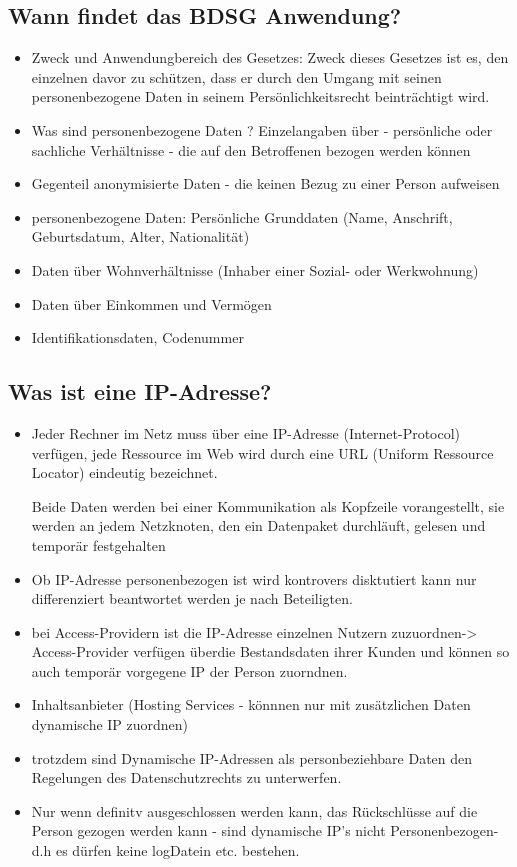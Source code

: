 \documentclass[a4paper,10pt]{scrartcl}
\begin{document}
\subsection{Wann findet das BDSG Anwendung?}
\begin{itemize}
 \item Zweck und Anwendungbereich des Gesetzes: Zweck dieses Gesetzes ist es, den einzelnen
 davor zu schützen, dass er durch den Umgang mit seinen personenbezogene Daten in seinem
 Persönlichkeitsrecht beinträchtigt wird.
 \item Was sind personenbezogene Daten ? Einzelangaben über - persönliche oder sachliche Verhältnisse - die auf den
 Betroffenen bezogen werden können
 \item Gegenteil anonymisierte Daten - die keinen Bezug zu einer Person aufweisen
 \item personenbezogene Daten: Persönliche Grunddaten (Name, Anschrift, Geburtsdatum, Alter, Nationalität)
 \item Daten über Wohnverhältnisse (Inhaber einer Sozial- oder Werkwohnung)
 \item Daten über Einkommen und Vermögen
 \item Identifikationsdaten, Codenummer
\end{itemize}

\subsection{Was ist eine IP-Adresse?}
\begin{itemize}
\item Jeder Rechner im Netz muss über eine IP-Adresse (Internet-Protocol) 
verfügen, jede Ressource im Web wird durch eine URL (Uniform Ressource 
Locator) eindeutig bezeichnet.

Beide Daten werden bei einer Kommunikation als Kopfzeile vorangestellt, sie 
werden an jedem Netzknoten, den ein Datenpaket durchläuft, gelesen und 
temporär festgehalten

\item Ob IP-Adresse personenbezogen ist wird kontrovers disktutiert kann nur differenziert beantwortet werden
je nach Beteiligten.
\item bei Access-Providern ist die IP-Adresse einzelnen Nutzern zuzuordnen->
Access-Provider verfügen überdie Bestandsdaten ihrer Kunden und können so auch
temporär vorgegene IP der Person zuorndnen.
\item Inhaltsanbieter (Hosting Services - könnnen nur mit zusätzlichen Daten
dynamische IP zuordnen)
\item trotzdem sind Dynamische IP-Adressen als personbeziehbare Daten den Regelungen
des Datenschutzrechts zu unterwerfen.
\item Nur wenn definitv ausgeschlossen werden kann, das Rückschlüsse auf die Person gezogen
werden kann - sind dynamische IP's nicht Personenbezogen- d.h es dürfen keine logDatein
etc. bestehen.
\end{itemize}
\end{document}
